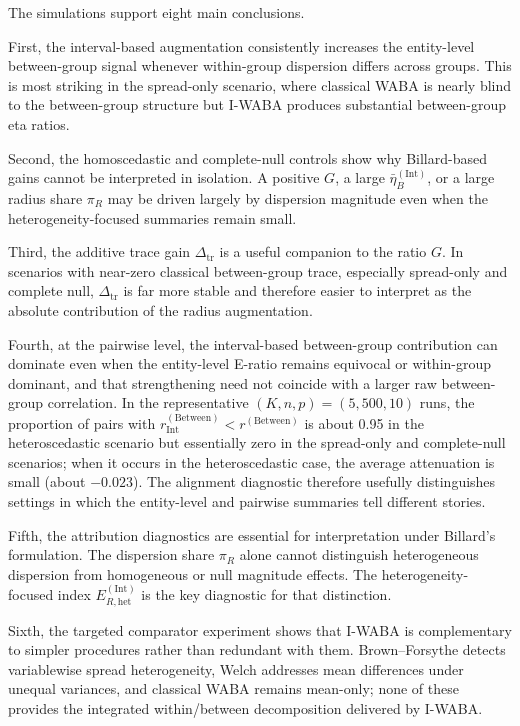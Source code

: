 \documentclass[preprint, times, 12pt, authoryear]{elsarticle}
\begin{document}
The simulations support eight main conclusions.

First, the interval-based augmentation consistently increases the entity-level between-group signal whenever within-group dispersion differs across groups. This is most striking in the spread-only scenario, where classical WABA is nearly blind to the between-group structure but I-WABA produces substantial between-group eta ratios.

Second, the homoscedastic and complete-null controls show why Billard-based gains cannot be interpreted in isolation. A positive $G$, a large $\bar\eta_B^{(\mathrm{Int})}$, or a large radius share $\pi_R$ may be driven largely by dispersion magnitude even when the heterogeneity-focused summaries remain small.

Third, the additive trace gain $\Delta_{\mathrm{tr}}$ is a useful companion to the ratio $G$. In scenarios with near-zero classical between-group trace, especially spread-only and complete null, $\Delta_{\mathrm{tr}}$ is far more stable and therefore easier to interpret as the absolute contribution of the radius augmentation.

Fourth, at the pairwise level, the interval-based between-group contribution can dominate even when the entity-level E-ratio remains equivocal or within-group dominant, and that strengthening need not coincide with a larger raw between-group correlation. In the representative $(K,n,p)=(5,500,10)$ runs, the proportion of pairs with $r_{\mathrm{Int}}^{(\mathrm{Between})}<r^{(\mathrm{Between})}$ is about 0.95 in the heteroscedastic scenario but essentially zero in the spread-only and complete-null scenarios; when it occurs in the heteroscedastic case, the average attenuation is small (about $-0.023$). The alignment diagnostic therefore usefully distinguishes settings in which the entity-level and pairwise summaries tell different stories.

Fifth, the attribution diagnostics are essential for interpretation under Billard's formulation. The dispersion share $\pi_R$ alone cannot distinguish heterogeneous dispersion from homogeneous or null magnitude effects. The heterogeneity-focused index $E_{R,\mathrm{het}}^{(\mathrm{Int})}$ is the key diagnostic for that distinction.

Sixth, the targeted comparator experiment shows that I-WABA is complementary to simpler procedures rather than redundant with them. Brown--Forsythe detects variablewise spread heterogeneity, Welch addresses mean differences under unequal variances, and classical WABA remains mean-only; none of these provides the integrated within/between decomposition delivered by I-WABA.
\end{document}

